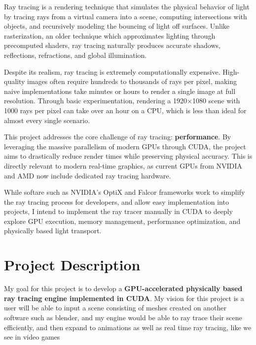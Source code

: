 \documentclass[11pt]{article}
\begin{document}
Ray tracing is a rendering technique that simulates the physical behavior of light by tracing rays from a virtual camera into a scene, computing intersections with objects, and recursively modeling the bouncing of light off surfaces.
Unlike rasterization, an older technique which approximates lighting through precomputed shaders, ray tracing naturally produces accurate shadows, reflections, refractions, and global illumination.

Despite its realism, ray tracing is extremely computationally expensive.
High-quality images often require hundreds to thousands of rays per pixel, making naive implementations take minutes or hours to render a single image at full resolution.
Through basic experimentation, rendering a 1920×1080 scene with 1000 rays per pixel can take over an hour on a CPU, which is less than ideal for almost every single scenario.

This project addresses the core challenge of ray tracing: \textbf{performance}.
By leveraging the massive parallelism of modern GPUs through CUDA, the project aims to drastically reduce render times while preserving physical accuracy.
This is directly relevant to modern real-time graphics, as current GPUs from NVIDIA and AMD now include dedicated ray tracing hardware.

While softare such as NVIDIA's OptiX and Falcor frameworks work to simplify the ray tracing process for developers, and allow easy implementation into projects, I intend to implement the ray tracer manually in CUDA to deeply explore GPU execution, memory management, performance optimization, and physically based light transport.

\section{Project Description}

My goal for this project is to develop a \textbf{GPU-accelerated physically based ray tracing engine implemented in CUDA}. My vision for this project is a user will be able to input a scene consisting of meshes created on another software such as blender, and my engine would be able to ray trace their scene efficiently, and then expand to animations as well as real time ray tracing, like we see in video games
\end{document}
